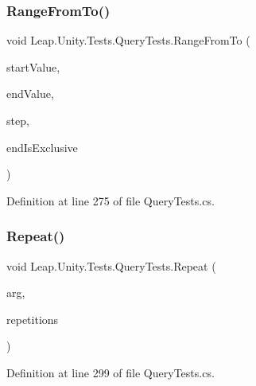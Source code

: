 \subsubsection{\texorpdfstring{RangeFromTo()}{RangeFromTo()}}
{\footnotesize\ttfamily void Leap.\+Unity.\+Tests.\+Query\+Tests.\+Range\+From\+To (\begin{DoxyParamCaption}\item[{\mbox{[}\+Values(0, 1, 100, -\/1, -\/100)\mbox{]} int}]{start\+Value,  }\item[{\mbox{[}\+Values(0, 1, 100, -\/1, -\/100)\mbox{]} int}]{end\+Value,  }\item[{\mbox{[}\+Values(1, 2, 10)\mbox{]} int}]{step,  }\item[{\mbox{[}\+Values(true, false)\mbox{]} bool}]{end\+Is\+Exclusive }\end{DoxyParamCaption})}



Definition at line 275 of file Query\+Tests.\+cs.

\mbox{\label{class_leap_1_1_unity_1_1_tests_1_1_query_tests_ad81f80eef768928fe3ce68cad67ec93f}} 
\subsubsection{\texorpdfstring{Repeat()}{Repeat()}}
{\footnotesize\ttfamily void Leap.\+Unity.\+Tests.\+Query\+Tests.\+Repeat (\begin{DoxyParamCaption}\item[{\mbox{[}\+Value\+Source(\char`\"{}list0\char`\"{})\mbox{]} \mbox{\hyperlink{class_leap_1_1_unity_1_1_tests_1_1_query_tests_1_1_query_arg}{Query\+Arg}}}]{arg,  }\item[{\mbox{[}\+Values(0, 1, 2, 3, 100)\mbox{]} int}]{repetitions }\end{DoxyParamCaption})}



Definition at line 299 of file Query\+Tests.\+cs.

\mbox{\label{class_leap_1_1_unity_1_1_tests_1_1_query_tests_a86da088c148763716146ec948dcbbd9d}} 
